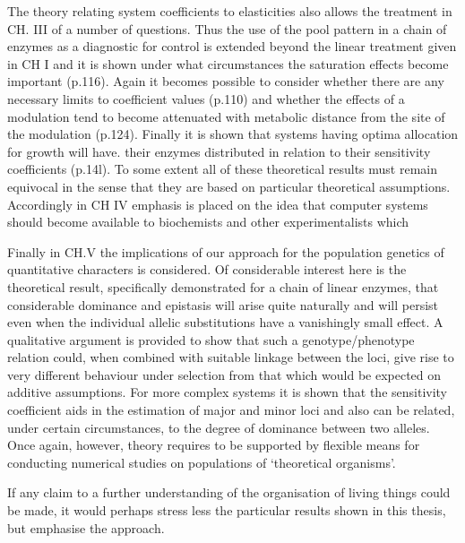 The theory relating system coefficients to elasticities also allows the treatment in CH. III of a number of questions. Thus the use of the pool pattern in a chain of enzymes as a diagnostic for control is extended beyond the linear treatment given in CH I and it is shown under what circumstances the saturation effects become important (p.116). Again it becomes possible to consider whether there are any necessary limits to coefficient values (p.110) and whether the effects of a modulation tend to become attenuated with metabolic distance from the site of the modulation (p.124). Finally it is shown that systems having optima allocation for growth will have. their enzymes distributed in relation to their sensitivity coefficients (p.14l). To some extent all of these theoretical results must remain equivocal in the sense that they are based on particular theoretical assumptions. Accordingly in CH IV emphasis is placed on the idea that computer systems should become available to biochemists and other experimentalists which

Finally in CH.V the implications of our approach for the population genetics of quantitative characters is considered. Of considerable interest here is the theoretical result, specifically demonstrated for a chain of linear enzymes, that considerable dominance and epistasis will arise quite naturally and will persist even when the individual allelic substitutions have a vanishingly small effect. A qualitative argument is provided to show that such a genotype/phenotype relation could, when combined with suitable linkage between the loci, give rise to very different behaviour under selection from that which would be expected on additive assumptions. For more complex systems it is shown that the sensitivity coefficient aids in the estimation of major and minor loci and also can be related, under certain circumstances, to the degree of dominance between two alleles. Once again, however, theory requires to be supported by flexible means for conducting numerical studies on populations of `theoretical organisms'. 

If any claim to a further understanding of the organisation of living things could be made, it would perhaps stress less the particular results shown in this thesis, but emphasise the approach.


